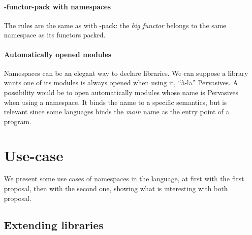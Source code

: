 \documentclass[11pt,a4paper]{article}
\begin{document}
\paragraph{-functor-pack with namespaces}

The rules are the same as with -pack: the \emph{big functor} belongs to the same
namespace as its functors packed.

\paragraph{Automatically opened modules}

Namespaces can be an elegant way to declare libraries. We can suppose a library
wants one of its modules is always opened when using it, ``à-la''
Pervasives. A possibility would be to open automatically modules whose name is
Pervasives when using a namespace. It binds the name to a specific semantics,
but is relevant since some languages binds the \emph{main} name as the entry
point of a program.



\section{Use-case}

We present some use cases of namespaces in the language, at first with the first
proposal, then with the second one, showing what is interesting with both proposal.

\subsection{Extending libraries}
\end{document}
